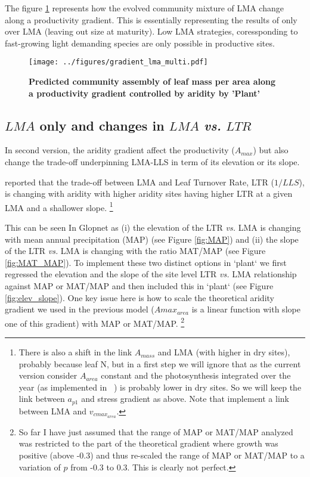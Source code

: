 \documentclass[a4paper,11pt]{article}
\begin{document}
The figure \ref{fig:lma} represents how the evolved community mixture
of LMA change along a productivity gradient. This is essentially
representing the results of \citet{Falster-2017} only over LMA
(leaving out size at maturity). Low LMA strategies, coressponding to
fast-growing light demanding species are only possible in productive sites.

\begin{figure}[ht]
\centering
\texttt{[image: ../figures/gradient\_lma\_multi.pdf]}
\caption{\textbf{Predicted community assembly of leaf mass per area along a productivity gradient controlled by aridity by 'Plant' \citep[see][]{Falster-2016}}
\label{fig:lma}}
\end{figure}

\clearpage

\subsection{$LMA$ only and changes in $LMA$ \textit{vs.} $LTR$}

In second version, the aridity gradient affect the productivity ($A_{max}$) but also change the trade-off underpinning LMA-LLS in term of its elevation or its slope.

\citet{Wright-2005} reported that the trade-off between LMA and Leaf Turnover Rate, LTR ($1/LLS$), is changing with aridity with higher aridity sites having higher LTR at a given LMA and a shallower slope. \footnote{There is also a shift in the link $A_{mass}$ and LMA (with higher in dry sites), probably because leaf N, but in a first step we will ignore that as the current version consider $A_{area}$ constant and the photosynthesis integrated over the year (as implemented in \plant\ ) is probably lower in dry sites. So we will keep the link between $a_{p1}$ and stress gradient as above. Note that \citet{Sakschewski-2015} implement a link between LMA and $v_{cmax_{area}}$.}

This can be seen In Glopnet as (i) the elevation of the LTR \textit{vs.} LMA is changing with mean annual precipitation (MAP) (see Figure \ref{fig:MAP}) and (ii) the slope of the LTR \textit{vs.} LMA is changing with the ratio MAT/MAP (see Figure \ref{fig:MAT_MAP}). To implement these two distinct options in `plant` we first regressed the elevation and the slope of the site level LTR \textit{vs.} LMA relationship against MAP or MAT/MAP and then included this in `plant` (see Figure \ref{fig:elev_slope}). One key issue here is how to scale the theoretical aridity gradient we used in the previous model ($A{max}_{area}$ is a linear function with slope one of this gradient) with MAP or MAT/MAP. \footnote{So far I have just assumed that the range of MAP or MAT/MAP analyzed was restricted to the part of the theoretical gradient where growth was positive (above -0.3) and thus re-scaled the range of MAP or MAT/MAP to a variation of $p$ from -0.3 to 0.3. This is clearly not perfect.}
\end{document}
